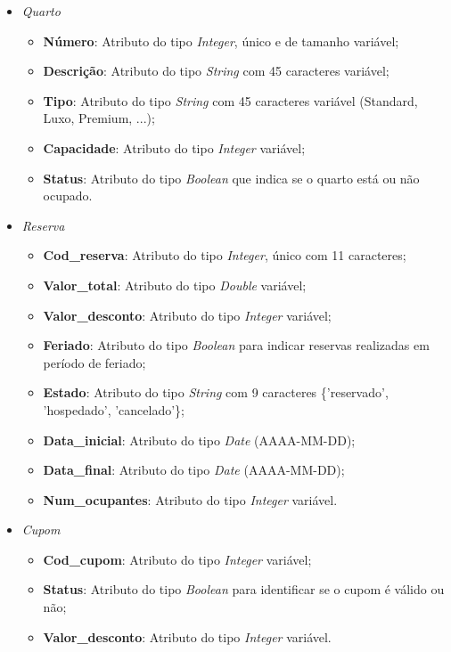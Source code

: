 \documentclass[a4paper, 12pt]{article}
\begin{document}
\begin{itemize}
    \item \emph{\large Quarto}
    \begin{itemize}
        \item \textbf{Número}: Atributo do tipo \emph{Integer}, único e de tamanho variável;
        \item \textbf{Descrição}: Atributo do tipo \emph{String} com 45 caracteres variável;
        \item \textbf{Tipo}: Atributo do tipo \emph{String} com 45 caracteres variável (Standard, Luxo, Premium, ...);
        \item \textbf{Capacidade}: Atributo do tipo \emph{Integer} variável;
        \item \textbf{Status}: Atributo do tipo \emph{Boolean} que indica se o quarto está ou não ocupado.
    \end{itemize}
    
    \item \emph{\large Reserva}
    \begin{itemize}
        \item \textbf{Cod\_reserva}: Atributo do tipo \emph{Integer}, único com 11 caracteres;
        \item \textbf{Valor\_total}: Atributo do tipo \emph{Double} variável;
        \item \textbf{Valor\_desconto}: Atributo do tipo \emph{Integer} variável;
        \item \textbf{Feriado}: Atributo do tipo \emph{Boolean} para indicar reservas realizadas em período de feriado;
        \item \textbf{Estado}: Atributo do tipo \emph{String} com 9 caracteres \{'reservado', 'hospedado', 'cancelado'\};
        \item \textbf{Data\_inicial}: Atributo do tipo \emph{Date} (AAAA-MM-DD);
        \item \textbf{Data\_final}: Atributo do tipo \emph{Date} (AAAA-MM-DD);
        \item \textbf{Num\_ocupantes}: Atributo do tipo \emph{Integer} variável.
    \end{itemize}
    
\pagebreak

    \item \emph{\large Cupom}
    \begin{itemize}
        \item \textbf{Cod\_cupom}: Atributo do tipo \emph{Integer} variável;
        \item \textbf{Status}: Atributo do tipo \emph{Boolean} para identificar se o cupom é válido ou não;
        \item \textbf{Valor\_desconto}: Atributo do tipo \emph{Integer} variável.
    \end{itemize}


\end{itemize}
\end{document}
